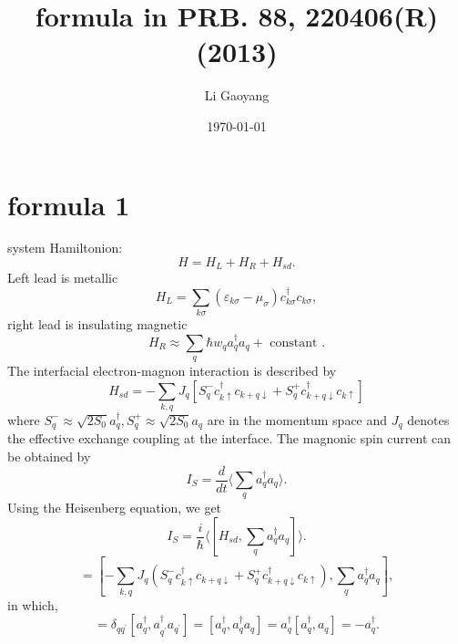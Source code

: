 \documentclass[11pt,a4paper]{article}
\begin{document}
\title{formula in PRB. 88, 220406(R) (2013)}
\author{Li Gaoyang}
\date{\today}
\maketitle
\tableofcontents

\section{formula 1}
system Hamiltonion:
\begin{equation}
H=H_{L}+H_{R}+H_{s d}.
\end{equation}
Left lead is metallic
\begin{equation}
H_{L} = \sum_{k\sigma} \left(\varepsilon_{k\sigma}-\mu_{\sigma}\right) c_{k \sigma}^{\dagger} c_{k \sigma},
\end{equation}
right lead is insulating magnetic
\begin{equation}
H_{R} \approx \sum_{q} \hbar w_{q} a_{q}^{\dagger} a_{q}+\text { constant }.
\end{equation}
The interfacial electron-magnon interaction is described by
\begin{equation}
H_{s d}=-\sum_{k, q} J_{q}\left[S_{q}^{-} c_{k \uparrow}^{\dagger} c_{k+q \downarrow}+S_{q}^{+} c_{k+q \downarrow}^{\dagger} c_{k \uparrow}\right]
\end{equation}
where $S_{q}^{-} \approx \sqrt{2 S_{0}} a_{q}^{\dagger}, S_{q}^{+} \approx \sqrt{2 S_{0}} a_{q}$ are in the momentum space and $J_{q}$ denotes the effective exchange coupling at the interface. The magnonic spin current can be obtained by
\begin{equation}
I_{S} = \frac{d}{dt} \langle \sum_{q}a_{q}^{\dag}a_{q}\rangle.
\end{equation}
Using the Heisenberg equation, we get
\begin{equation}
I_{S}=\frac{i}{\hbar}\langle[H_{s d}, \sum_{q} a_{q}^{\dagger} a_{q}]\rangle.
\end{equation}
\begin{equation}
[H_{s d}, \sum_{q} a_{q}^{\dagger} a_{q}] = [-\sum_{k, q} J_{q}\left(S_{q}^{-} c_{k \uparrow}^{\dagger} c_{k+q \downarrow}+S_{q}^{+} c_{k+q \downarrow}^{\dagger} c_{k \uparrow}\right), \sum_{q} a_{q}^{\dagger} a_{q}],
\end{equation}
in which,
\begin{equation}
[a_{q}^{\dag}, \sum_{q^{\prime}} a_{q'}^{\dagger}, a_{q^{\prime}}] = \delta_{q q^{\prime}}[a_{q}^{\dagger}, a_{q^{\prime}}^{\dagger} a_{q^{\prime}}] = [a_{q}^{\dagger}, a_{q}^{\dagger} a_{q}] = a_{q}^{\dagger}[a_{q}^{\dagger}, a_{q}] = - a_{q}^{\dagger}.
\end{equation}
\end{document}
